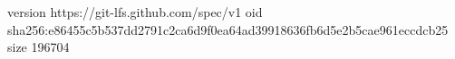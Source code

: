 version https://git-lfs.github.com/spec/v1
oid sha256:e86455c5b537dd2791c2ca6d9f0ea64ad39918636fb6d5e2b5cae961eccdcb25
size 196704
